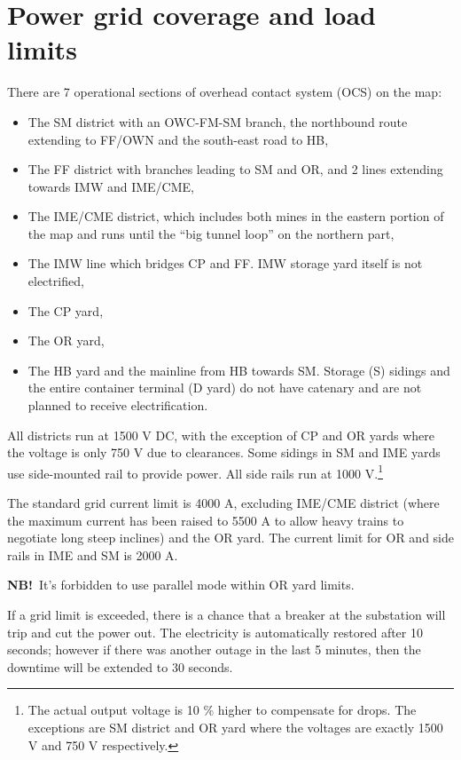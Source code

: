 \documentclass[11pt, a4paper]{article}
\newcommand{\powermode}[1]{%
    \begingroup
    \setlength{\fboxsep}{0pt}%
    \raisebox{0.1em}{%
        \colorbox{black}{%
            \parbox[c][1.4em][c]{1.4em}{%
                \centering
                \color{white}\bfseries #1%
            }%
        }%
    }%
    \endgroup
}
\newcommand{\NB}{\textbf{NB!}}
\begin{document}
\section{Power grid coverage and load limits}

There are 7 operational sections of overhead contact system (OCS) on the map:
\begin{itemize}
\item The SM district with an OWC-FM-SM branch, the northbound route extending to FF/OWN and the south-east road to HB,
\item The FF district with branches leading to SM and OR, and 2 lines extending towards IMW and IME/CME,
\item The IME/CME district, which includes both mines in the eastern portion of the map and runs until the ``big tunnel loop'' on the northern part,
\item The IMW line which bridges CP and FF. IMW storage yard itself is not electrified,
\item The CP yard,
\item The OR yard,
\item The HB yard and the mainline from HB towards SM. Storage (S) sidings and the entire container terminal (D yard) do not have catenary and are not planned to receive electrification.
\end{itemize}

All districts run at 1500 V DC, with the exception of CP and OR yards where the voltage is only 750 V due to clearances. Some sidings in SM and IME yards use side-mounted rail to provide power. All side rails run at 1000 V.\footnote{The actual output voltage is 10 \% higher to compensate for drops. The exceptions are SM district and OR yard where the voltages are exactly 1500 V and 750 V respectively.}

The standard grid current limit is 4000 A, excluding IME/CME district (where the maximum current has been raised to 5500 A to allow heavy trains to negotiate long steep inclines) and the OR yard. The current limit for OR and side rails in IME and SM is 2000 A.

\NB\ It's forbidden to use \powermode{P} parallel mode within OR yard limits.

If a grid limit is exceeded, there is a chance that a breaker at the substation will trip and cut the power out. The electricity is automatically restored after 10 seconds; however if there was another outage in the last 5 minutes, then the downtime will be extended to 30 seconds.
\newpage
\end{document}
